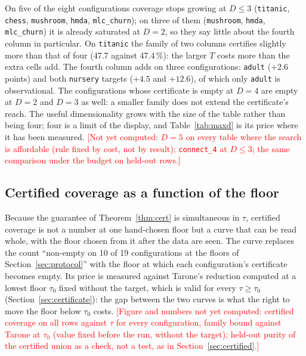 \documentclass[11pt]{article}
\newcommand{\todo}[1]{\textcolor{red}{[#1]}}
\begin{document}
On five of the eight configurations coverage stops growing at $D\le3$ (\texttt{titanic}, \texttt{chess}, \texttt{mushroom}, \texttt{hmda}, \texttt{mlc\_churn}); on three of them (\texttt{mushroom}, \texttt{hmda}, \texttt{mlc\_churn}) it is already saturated at $D=2$, so they say little about the fourth column in particular. On \texttt{titanic} the family of two columns certifies slightly more than that of four (47.7 against 47.4\,\%): the larger $T$ costs more than the extra cells add. The fourth column adds on three configurations: \texttt{adult} ($+2.6$ points) and both \texttt{nursery} targets ($+4.5$ and $+12.6$), of which only \texttt{adult} is observational. The configurations whose certificate is empty at $D=4$ are empty at $D=2$ and $D=3$ as well: a smaller family does not extend the certificate's reach. The useful dimensionality grows with the size of the table rather than being four; four is a limit of the display, and Table~\ref{tab:maxd} is its price where it has been measured. \todo{Not yet computed: $D=5$ on every table where the search is affordable (rule fixed by cost, not by result); \texttt{connect\_4} at $D\le3$; the same comparison under the budget on held-out rows.}

\subsection{Certified coverage as a function of the floor}\label{sec:taucurve}
Because the guarantee of Theorem~\ref{thm:cert} is simultaneous in $\tau$, certified coverage is not a number at one hand-chosen floor but a curve that can be read whole, with the floor chosen from it after the data are seen. The curve replaces the count ``non-empty on 10 of 19 configurations at the floors of Section~\ref{sec:protocol}'' with the floor at which each configuration's certificate becomes empty. Its price is measured against Tarone's reduction computed at a lowest floor $\tau_0$ fixed without the target, which is valid for every $\tau\ge\tau_0$ (Section~\ref{sec:certificate}): the gap between the two curves is what the right to move the floor below $\tau_0$ costs. \todo{Figure and numbers not yet computed: certified coverage on all rows against $\tau$ for every configuration, family bound against Tarone at $\tau_0$ (value fixed before the run, without the target); held-out purity of the certified union as a check, not a test, as in Section~\ref{sec:certified}.}
\end{document}
